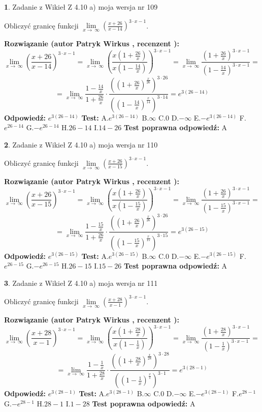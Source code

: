 \documentclass[12pt, a4paper]{article}
\theoremstyle{definition} %
\newtheorem{zad}{}
\newcommand{\zadStart}[1]{\begin{zad}#1\newline}
\newcommand{\zadStop}{\end{zad}}
\newcommand{\rozwStart}[2]{\noindent \textbf{Rozwiązanie (autor #1 , recenzent #2): }\newline}
\newcommand{\rozwStop}{\newline}
\newcommand{\odpStart}{\noindent \textbf{Odpowiedź:}\newline}
\newcommand{\odpStop}{\newline}
\newcommand{\testStart}{\noindent \textbf{Test:}\newline}
\newcommand{\testStop}{\newline}
\newcommand{\kluczStart}{\noindent \textbf{Test poprawna odpowiedź:}\newline}
\newcommand{\kluczStop}{\newline}
\begin{document}
\zadStart{Zadanie z Wikieł Z 4.10 a) moja wersja nr 109}


Obliczyć granicę funkcji  $\lim\limits_{x\to\ \infty}(\frac{x+26}{x-14})^{3\cdot x-1}$.
\zadStop
\rozwStart{Patryk Wirkus}{}
$$\lim\limits_{x\to\ \infty}(\frac{x+26}{x-14})^{3\cdot x-1} = \lim\limits_{x\to\ \infty}(\frac{x(1+\frac{26}{x})}{x(1-\frac{14}{x})})^{3\cdot x-1}=\lim\limits_{x\to\ \infty}\frac{(1+\frac{26}{x})^{3\cdot x-1}}{(1-\frac{14}{x})^{3\cdot x-1}}=$$
$$=\lim\limits_{x\to\ \infty}\frac{1-\frac{14}{x}}{1+\frac{26}{x}}\cdot\frac{((1+\frac{26}{x})^{\frac{x}{26}})^{3\cdot26}}{((1-\frac{14}{x})^{\frac{x}{14}})^{3\cdot14}}=e^{3(26-14)}$$
\rozwStop
\odpStart
$e^{3(26-14)}$
\odpStop
\testStart
A.$e^{3(26-14)}$ B.$\infty$ C.$0$ D.$-\infty$ E.$-e^{3(26-14)}$
F.$e^{26-14}$ G.$-e^{26-14}$
H.$26-14$
I.$14-26$
\testStop
\kluczStart
A
\kluczStop



\zadStart{Zadanie z Wikieł Z 4.10 a) moja wersja nr 110}


Obliczyć granicę funkcji  $\lim\limits_{x\to\ \infty}(\frac{x+26}{x-15})^{3\cdot x-1}$.
\zadStop
\rozwStart{Patryk Wirkus}{}
$$\lim\limits_{x\to\ \infty}(\frac{x+26}{x-15})^{3\cdot x-1} = \lim\limits_{x\to\ \infty}(\frac{x(1+\frac{26}{x})}{x(1-\frac{15}{x})})^{3\cdot x-1}=\lim\limits_{x\to\ \infty}\frac{(1+\frac{26}{x})^{3\cdot x-1}}{(1-\frac{15}{x})^{3\cdot x-1}}=$$
$$=\lim\limits_{x\to\ \infty}\frac{1-\frac{15}{x}}{1+\frac{26}{x}}\cdot\frac{((1+\frac{26}{x})^{\frac{x}{26}})^{3\cdot26}}{((1-\frac{15}{x})^{\frac{x}{15}})^{3\cdot15}}=e^{3(26-15)}$$
\rozwStop
\odpStart
$e^{3(26-15)}$
\odpStop
\testStart
A.$e^{3(26-15)}$ B.$\infty$ C.$0$ D.$-\infty$ E.$-e^{3(26-15)}$
F.$e^{26-15}$ G.$-e^{26-15}$
H.$26-15$
I.$15-26$
\testStop
\kluczStart
A
\kluczStop



\zadStart{Zadanie z Wikieł Z 4.10 a) moja wersja nr 111}


Obliczyć granicę funkcji  $\lim\limits_{x\to\ \infty}(\frac{x+28}{x-1})^{3\cdot x-1}$.
\zadStop
\rozwStart{Patryk Wirkus}{}
$$\lim\limits_{x\to\ \infty}(\frac{x+28}{x-1})^{3\cdot x-1} = \lim\limits_{x\to\ \infty}(\frac{x(1+\frac{28}{x})}{x(1-\frac{1}{x})})^{3\cdot x-1}=\lim\limits_{x\to\ \infty}\frac{(1+\frac{28}{x})^{3\cdot x-1}}{(1-\frac{1}{x})^{3\cdot x-1}}=$$
$$=\lim\limits_{x\to\ \infty}\frac{1-\frac{1}{x}}{1+\frac{28}{x}}\cdot\frac{((1+\frac{28}{x})^{\frac{x}{28}})^{3\cdot28}}{((1-\frac{1}{x})^{\frac{x}{1}})^{3\cdot1}}=e^{3(28-1)}$$
\rozwStop
\odpStart
$e^{3(28-1)}$
\odpStop
\testStart
A.$e^{3(28-1)}$ B.$\infty$ C.$0$ D.$-\infty$ E.$-e^{3(28-1)}$
F.$e^{28-1}$ G.$-e^{28-1}$
H.$28-1$
I.$1-28$
\testStop
\kluczStart
A
\kluczStop
\end{document}
